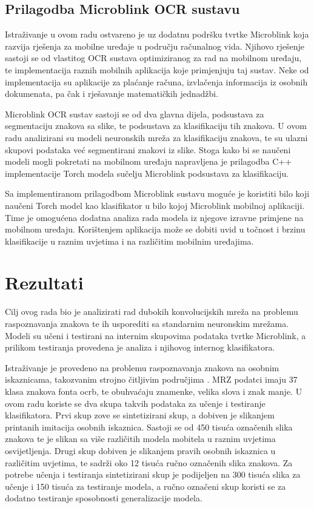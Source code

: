 \documentclass[lmodern, utf8, diplomski, numeric]{fer}
\begin{document}
\section{Prilagodba Microblink OCR sustavu}

Istraživanje u ovom radu ostvareno je uz dodatnu podršku tvrtke Microblink koja razvija rješenja za mobilne uređaje u području računalnog vida. Njihovo rješenje sastoji se od vlastitog OCR sustava optimiziranog za rad na mobilnom uređaju, te implementacija raznih mobilnih aplikacija koje primjenjuju taj sustav. Neke od implementacija su aplikacije za plaćanje računa, izvlačenja informacija iz osobnih dokumenata, pa čak i rješavanje matematičkih jednadžbi. 

Microblink OCR sustav sastoji se od dva glavna dijela, podsustava za segmentaciju znakova sa slike, te podsustava za klasifikaciju tih znakova. U ovom radu analizirani su modeli neuronskih mreža za klasifikaciju znakova, te su ulazni skupovi podataka već segmentirani znakovi iz slike. Stoga kako bi se naučeni modeli mogli pokretati na mobilnom uređaju napravljena je prilagodba C++ implementacije Torch modela sučelju Microblink podsustava za klasifikaciju.

Sa implementiranom prilagodbom Microblink sustavu moguće je koristiti bilo koji naučeni Torch model kao klasifikator u bilo kojoj Microblink mobilnoj aplikaciji. Time je omogućena dodatna analiza rada modela iz njegove izravne primjene na mobilnom uređaju. Korištenjem aplikacija može se dobiti uvid u točnost i brzinu klasifikacije u raznim uvjetima i na različitim mobilnim uređajima.  


\chapter{Rezultati}

Cilj ovog rada bio je analizirati rad dubokih konvolucijskih mreža na problemu raspoznavanja znakova te ih usporediti sa standarnim neuronskim mrežama. Modeli su učeni i testirani na internim skupovima podataka tvrtke Microblink, a prilikom testiranja provedena je analiza i njihovog internog klasifikatora. 

Istraživanje je provedeno na problemu raspoznavanja znakova na osobnim iskaznicama, takozvanim strojno čitljivim područjima . MRZ podatci imaju 37 klasa znakova fonta ocrb, te obuhvaćaju znamenke, velika slova i znak manje. U ovom radu koriste se dva skupa takvih podataka za učenje i testiranje klasifikatora. Prvi skup zove se sintetizirani skup, a dobiven je slikanjem printanih imitacija osobnih iskaznica. Sastoji se od 450 tisuća označenih slika znakova te je slikan sa više različitih modela mobitela u raznim uvjetima osvijetljenja. Drugi skup dobiven je slikanjem pravih osobnih iskaznica u različitim uvjetima, te sadrži oko 12 tisuća ručno označenih slika znakova. Za potrebe učenja i testiranja sintetizirani skup je podijeljen na 300 tisuća slika za učenje i 150 tisuća za testiranje modela, a ručno označeni skup koristi se za dodatno testiranje sposobnosti generalizacije modela.
\end{document}

